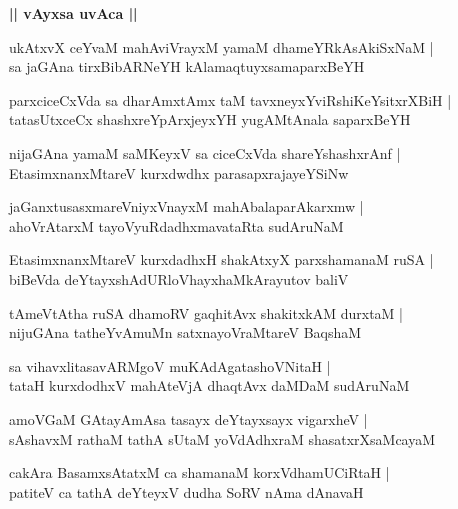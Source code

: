 \documentclass[twoside,12pt,openright]{book}
\newcounter{shloka}[chapter]
\def\uvaca#1{\centerline{{\large\textbf{#1}}}}
\begin{document}
\uvaca{|| vAyxsa uvAca ||}

\begin{shloka}%
ukAtxvX ceYvaM mahAviVrayxM yamaM dhameYRkAsAkiSxNaM |\\
sa jaGAna tirxBibARNeYH kAlamaqtuyxsamaparxBeYH
\end{shloka}

\begin{shloka}%
parxciceCxVda sa dharAmxtAmx taM tavxneyxYviRshiKeYsitxrXBiH |\\
tatasUtxceCx shashxreYpArxjeyxYH yugAMtAnala saparxBeYH 
\end{shloka}

\begin{shloka}%
nijaGAna yamaM saMKeyxV sa ciceCxVda shareYshashxrAnf |\\
EtasimxnanxMtareV kurxdwdhx parasapxrajayeYSiNw
\end{shloka}

\begin{shloka}%
jaGanxtusasxmareVniyxVnayxM mahAbalaparAkarxmw |\\
ahoVrAtarxM tayoVyuRdadhxmavataRta sudAruNaM 
\end{shloka}

\begin{shloka}%
EtasimxnanxMtareV kurxdadhxH shakAtxyX parxshamanaM ruSA |\\
biBeVda deYtayxshAdURloVhayxhaMkArayutov baliV 
\end{shloka}

\begin{shloka}%
tAmeVtAtha ruSA dhamoRV gaqhitAvx shakitxkAM durxtaM |\\
nijuGAna tatheYvAmuMn satxnayoVraMtareV BaqshaM 
\end{shloka}

\begin{shloka}%
sa vihavxlitasavARMgoV muKAdAgatashoVNitaH |\\
tataH kurxdodhxV mahAteVjA dhaqtAvx daMDaM sudAruNaM 
\end{shloka}

\begin{shloka}%
amoVGaM GAtayAmAsa tasayx deYtayxsayx vigarxheV |\\
sAshavxM rathaM tathA sUtaM yoVdAdhxraM shasatxrXsaMcayaM 
\end{shloka}

\begin{shloka}%
cakAra BasamxsAtatxM ca shamanaM korxVdhamUCiRtaH |\\
patiteV ca tathA deYteyxV dudha SoRV nAma dAnavaH 
\end{shloka}
\end{document}

